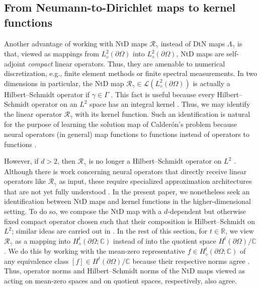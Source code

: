 \documentclass[pdflatex,sn-mathphys-num]{sn-jnl-preprint}
\newcommand{\R}{\mathbb{R}}
\newcommand{\C}{\mathbb{C}}
\newcommand{\sL}{\mathscr{L}}
\newcommand{\pOmega}{{\partial\Omega}}
\newcommand{\dtn}{\Lambda_{\gamma}}
\newcommand{\ntd}{\mathscr{R}_{\gamma}}
\theoremstyle{thmstyleone}%
\theoremstyle{thmstyletwo}%
\theoremstyle{thmstylethree}%
\numberwithin{equation}{section}
\numberwithin{theorem}{section}
\begin{document}
\subsection{From Neumann-to-Dirichlet maps to kernel functions}\label{sec:extend_kernel}
Another advantage of working with NtD maps $\ntd$ instead of DtN maps $\dtn$ is that, viewed as mappings from $L^2_\diamond(\pOmega)$ into $L^2_\diamond(\pOmega)$, NtD maps are self-adjoint \emph{compact} linear operators. Thus, they are amenable to numerical discretization, e.g., finite element methods or finite spectral measurements. In two dimensions in particular, the NtD map $\ntd\in \sL(L^2_\diamond(\pOmega))$ is actually a Hilbert--Schmidt operator if $\gamma\in\Gamma$ \cite[Lemma~A.1, p.~1948]{garde2022series}. This fact is useful because every Hilbert--Schmidt operator on an $L^2$ space has an integral kernel \cite[Prop.~2.8.6, p.~74]{arveson2002short}. Thus, we may identify the linear operator $\ntd$ with its kernel function. Such an identification is natural for the purpose of learning the solution map of Calder\'on's problem because neural operators (in general) map functions to functions instead of operators to functions \cite{kovachki2021neural}.

However, if $d>2$, then $\ntd$ is no longer a Hilbert--Schmidt operator on $L^2$ \cite[p.~1948]{garde2022series}. Although there is work concerning neural operators that directly receive linear operators like $\ntd$ as input, these require specialized approximation architectures that are not yet fully understood \cite{castro2024calderon,de2019deep,abhishek2024solving}.
In the present paper, we nonetheless seek an identification between NtD maps and kernel functions in the higher-dimensional setting. To do so, we compose the NtD map with a $d$-dependent but otherwise fixed compact operator chosen such that their composition is Hilbert--Schmidt on $L^2$; similar ideas are carried out in \cite[Sec.~4.3.2]{kratsios2023transfer}. In the rest of this section, for $t\in\R$, we view $\ntd$ as a mapping into $H^t_\diamond(\pOmega;\C)$ instead of into the quotient space $H^{t}(\pOmega)/\C$. We do this by working with the mean-zero representative $f\in H_\diamond^{t}(\pOmega;\C)$ of any equivalence class $[f]\in H^{t}(\pOmega)/\C$ because their respective norms agree \cite[Appendix~A, Remark (iii)]{abraham2019statistical}. Thus, operator norms and Hilbert--Schmidt norms of the NtD maps viewed as acting on mean-zero spaces and on quotient spaces, respectively, also agree.
\end{document}
